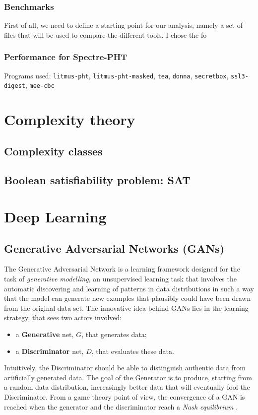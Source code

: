 \documentclass[12pt,a4paper]{book}
\theoremstyle{definition}
\begin{document}
	\subsection{Benchmarks}
	First of all, we need to define a starting point for our analysis, namely a set of files that will be used to compare the different tools. I chose the fo
	
	\subsection{Performance for Spectre-PHT}
	Programs used: \texttt{litmus-pht}, \texttt{litmus-pht-masked}, \texttt{tea}, \texttt{donna}, \texttt{secretbox}, \texttt{ssl3-digest}, \texttt{mee-cbc}
	
	\appendix
	\chapter{Complexity theory}\label{appendix:complexity}
	\section{Complexity classes}
	\section{Boolean satisfiability problem: SAT}
	\chapter{Deep Learning}\label{appendix:dl}
	\section{Generative Adversarial Networks (GANs)}
	The Generative Adversarial Network \cite{Goodfellow2014} is a learning framework designed for the task of \textit{generative modelling}, an unsupervised learning task that involves the automatic discovering and learning of patterns in data distributions in such a way that the model can generate new examples that plausibly could have been drawn from the original data set. The innovative idea behind GANs lies in the learning strategy, that sees two actors involved:
	\begin{itemize}
		\item a \textbf{Generative} net, $G$, that generates data;
		\item a \textbf{Discriminator} net, $D$, that evaluates these data.
	\end{itemize}
	Intuitively, the Discriminator should be able to distinguish authentic data from artificially generated data. The goal of the Generator is to produce, starting from a random data distribution, increasingly better data that will eventually fool the Discriminator. From a game theory point of view, the convergence of a GAN is reached when the generator and the discriminator reach a \textit{Nash equilibrium} \cite{Ratliff2013}.
\end{document}
